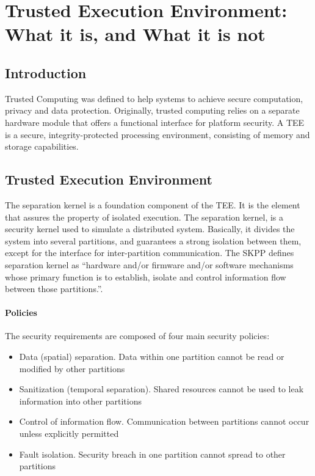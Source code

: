 \documentclass{article}
\begin{document}
\section{Trusted Execution Environment: What it is, and What it is not}

\subsection{Introduction}

Trusted Computing was defined to help systems to achieve secure computation, privacy and data protection. Originally, trusted computing relies on a separate hardware module that offers a functional interface for platform security. A TEE is a secure, integrity-protected processing environment, consisting of memory and storage capabilities.

\subsection{Trusted Execution Environment}

The separation kernel is a foundation component of the TEE. It is the element that assures the property of isolated execution. The separation kernel, is a security kernel used to simulate a distributed system. Basically, it divides the system into several partitions, and guarantees a strong isolation between them, except for the interface for inter-partition communication. The SKPP defines separation kernel as “hardware and/or firmware and/or software mechanisms whose primary function is to establish, isolate and control information flow between those partitions.”.

\paragraph{Policies}

The security requirements are composed of four main security policies:
\begin{itemize}
\item Data (spatial) separation. Data within one partition cannot be read or modified by other partitions
\item Sanitization (temporal separation). Shared resources cannot be used to leak information into other partitions
\item Control of information flow. Communication between partitions cannot occur unless explicitly permitted
\item Fault isolation. Security breach in one partition cannot spread to other partitions
\end{itemize}
\end{document}

